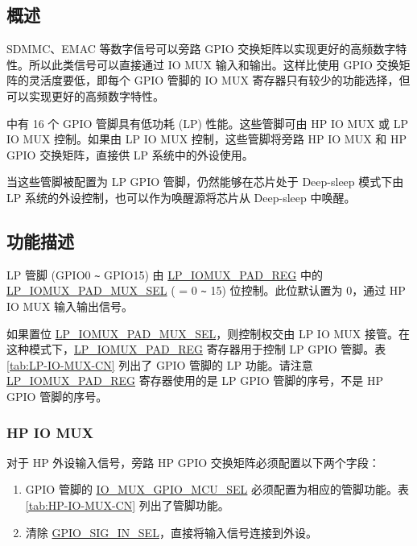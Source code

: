 \documentclass[main\_\_CN.tex]{subfiles}
\begin{document}
\subsection{概述}

SDMMC、EMAC 等数字信号可以旁路 GPIO 交换矩阵以实现更好的高频数字特性。所以此类信号可以直接通过 IO MUX 输入和输出。这样比使用 GPIO 交换矩阵的灵活度要低，即每个 GPIO 管脚的 IO MUX 寄存器只有较少的功能选择，但可以实现更好的高频数字特性。

\chipname{} 中有 16 个 GPIO 管脚具有低功耗 (LP) 性能。这些管脚可由 HP IO MUX 或 LP IO MUX 控制。如果由 LP IO MUX 控制，这些管脚将旁路 HP IO MUX 和 HP GPIO 交换矩阵，直接供 LP 系统中的外设使用。

当这些管脚被配置为 LP GPIO 管脚，仍然能够在芯片处于 Deep-sleep 模式下由 LP 系统的外设控制，也可以作为唤醒源将芯片从 Deep-sleep 中唤醒。

\subsection{功能描述}

LP 管脚 (GPIO0 \verb+~+ GPIO15) 由 \hyperref[regdesc:LPIOMUXPADNREG]{LP\_IOMUX\_PAD\_REG} 中的 \hyperref[fielddesc:LPIOMUXPADNMUXSEL] {LP\_IOMUX\_PAD\_MUX\_SEL} ( = 0 \verb+~+ 15) 位控制。此位默认置为 0，通过 HP IO MUX 输入输出信号。

如果置位 \hyperref[fielddesc:LPIOMUXPADNMUXSEL]{LP\_IOMUX\_PAD\_MUX\_SEL}，则控制权交由 LP IO MUX 接管。在这种模式下，\hyperref[regdesc:LPIOMUXPADNREG]{LP\_IOMUX\_PAD\_REG} 寄存器用于控制 LP GPIO 管脚。表 \ref{tab:LP-IO-MUX-CN} 列出了 GPIO 管脚的 LP 功能。请注意 \hyperref[regdesc:LPIOMUXPADNREG]{LP\_IOMUX\_PAD\_REG} 寄存器使用的是 LP GPIO 管脚的序号，不是 HP GPIO 管脚的序号。

\subsubsection{HP IO MUX}
对于 HP 外设输入信号，旁路 HP GPIO 交换矩阵必须配置以下两个字段：

\begin{enumerate}
\item GPIO 管脚的 \hyperref[fielddesc:IOMUXGPIONMCUSEL]{IO\_MUX\_GPIO\_MCU\_SEL} 必须配置为相应的管脚功能。表 \ref{tab:HP-IO-MUX-CN} 列出了管脚功能。
\item 清除 \hyperref[fielddesc:GPIOSIGNINSEL]{GPIO\_SIG\_IN\_SEL}，直接将输入信号连接到外设。
\end{enumerate}
\end{document}
